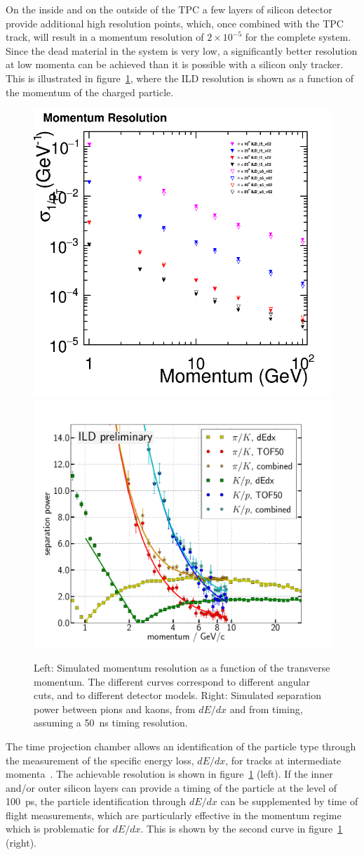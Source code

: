 \documentclass[%
 amsmath,amssymb,
 aps,
]{revtex4-1}
\begin{document}
On the inside and on the outside of the TPC a few layers of silicon detector provide additional high resolution points, which, once combined with the TPC track, will result in a momentum resolution of $2 \times 10^{-5}$ for the complete system. Since the dead material in the system is very low, a significantly better resolution at low momenta can be achieved than it is possible with a silicon only tracker. This is illustrated in figure~\ref{fig:momentumvsp}, where the ILD resolution is shown as a function of the momentum of the charged particle. 

\begin{figure}
    \centering
    \includegraphics[width=0.38\hsize]{figures/PResolution_ILD_ls5_v02.png}
        \includegraphics[width=0.45\hsize]{figures/Combined_dEdx_TOF50.pdf}
    \caption{ Left: Simulated momentum resolution as a function of the transverse momentum. The different curves correspond to different angular cuts, and to different detector models. Right: Simulated separation power between pions and kaons, from $dE/dx$ and from timing, assuming a 50~ns timing resolution.}
    \label{fig:momentumvsp}
\end{figure}

The time projection chamber allows an identification of the particle type through the measurement of the specific energy loss, $dE/dx$, for tracks at intermediate momenta~\cite{Hauschild:2000eg}. The achievable resolution is shown in figure~\ref{fig:momentumvsp} (left). If the inner and/or outer silicon layers can provide a timing of the particle at the level of 100~ps, the particle identification through $dE/dx$ can be supplemented by time of flight measurements, which are particularly effective in the momentum regime which is problematic for $dE/dx$. This is shown by the second curve in figure~\ref{fig:momentumvsp} (right). 
\end{document}
